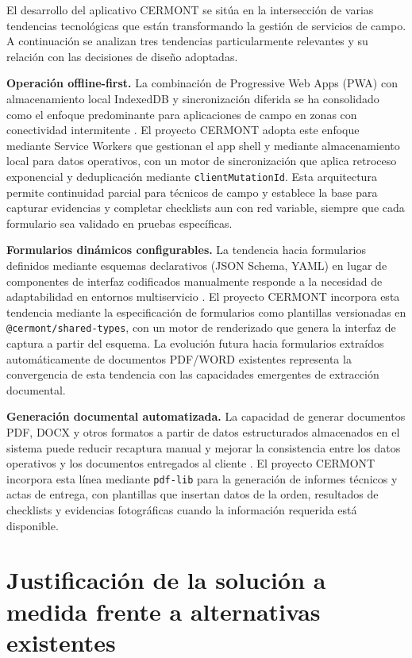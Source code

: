 El desarrollo del aplicativo CERMONT se sitúa en la intersección de varias tendencias tecnológicas que están transformando la gestión de servicios de campo. A continuación se analizan tres tendencias particularmente relevantes y su relación con las decisiones de diseño adoptadas.

\textbf{Operación offline-first.} La combinación de Progressive Web Apps (PWA) con almacenamiento local IndexedDB y sincronización diferida se ha consolidado como el enfoque predominante para aplicaciones de campo en zonas con conectividad intermitente \cite{gartner2024}. El proyecto CERMONT adopta este enfoque mediante Service Workers que gestionan el app shell y mediante almacenamiento local para datos operativos, con un motor de sincronización que aplica retroceso exponencial y deduplicación mediante \texttt{clientMutationId}. Esta arquitectura permite continuidad parcial para técnicos de campo y establece la base para capturar evidencias y completar checklists aun con red variable, siempre que cada formulario sea validado en pruebas específicas.

\textbf{Formularios dinámicos configurables.} La tendencia hacia formularios definidos mediante esquemas declarativos (JSON Schema, YAML) en lugar de componentes de interfaz codificados manualmente responde a la necesidad de adaptabilidad en entornos multiservicio \cite{rjsf,jsonforms}. El proyecto CERMONT incorpora esta tendencia mediante la especificación de formularios como plantillas versionadas en \texttt{@cermont/shared-types}, con un motor de renderizado que genera la interfaz de captura a partir del esquema. La evolución futura hacia formularios extraídos automáticamente de documentos PDF/WORD existentes representa la convergencia de esta tendencia con las capacidades emergentes de extracción documental.

\textbf{Generación documental automatizada.} La capacidad de generar documentos PDF, DOCX y otros formatos a partir de datos estructurados almacenados en el sistema puede reducir recaptura manual y mejorar la consistencia entre los datos operativos y los documentos entregados al cliente \cite{pypdfform2024}. El proyecto CERMONT incorpora esta línea mediante \texttt{pdf-lib} para la generación de informes técnicos y actas de entrega, con plantillas que insertan datos de la orden, resultados de checklists y evidencias fotográficas cuando la información requerida está disponible.

\section{Justificación de la solución a medida frente a alternativas existentes}
\label{sec:justificacion-a-medida}

